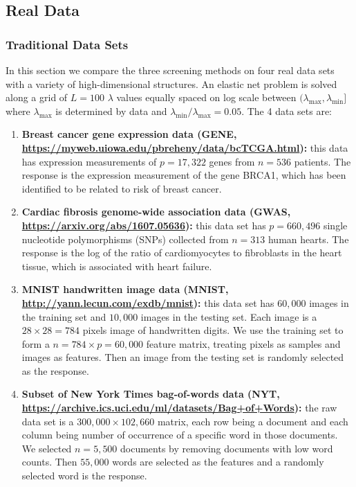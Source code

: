 \subsection{Real Data}

\subsubsection{Traditional Data Sets}

In this section we compare the three screening methods on four real data sets with a variety of high-dimensional structures. An elastic net problem is solved along a grid of $L=100$ $\lambda$ values equally spaced on log scale between $(\lambda_{\max},\lambda_{\min}]$ where $\lambda_{\max}$ is determined by data and $\lambda_{\min}/\lambda_{\max}=0.05$. The 4 data sets are:

\begin{enumerate}
    \item \textbf{Breast cancer gene expression data
(GENE, \url{https://myweb.uiowa.edu/pbreheny/data/bcTCGA.html}):} this data has expression measurements of $p=17,322$ genes from $n=536$ patients. The response is the expression measurement of the gene BRCA1, which has been identified to be related to risk of breast cancer.
    \item \textbf{Cardiac fibrosis genome-wide association data
(GWAS, \url{https://arxiv.org/abs/1607.05636}):} this data set has $p=660,496$ single nucleotide
polymorphisms (SNPs) collected from $n=313$ human hearts. The response is the log of the ratio of cardiomyocytes to fibroblasts in the heart tissue, which is associated with heart failure.
    \item \textbf{MNIST handwritten image data
(MNIST, \url{http://yann.lecun.com/exdb/mnist}):} this data set has $60,000$ images in the training set and $10,000$ images in the testing set. Each image is a $28\times 28=784$ pixels image of handwritten digits. We use the training set to form a $n=784\times p=60,000$ feature matrix, treating pixels as samples and images as features. Then an image from the testing set is randomly selected as the response.
    \item \textbf{Subset of New York Times bag-of-words data
(NYT, \url{https://archive.ics.uci.edu/ml/datasets/Bag+of+Words}):} the raw data set is a $300,000\times 102,660$ matrix, each row being a document and each column being number of occurrence of a specific word in those documents. We selected $n=5,500$ documents by removing documents with low word counts. Then $55,000$ words are selected as the features and a randomly selected word is the response.
\end{enumerate}

